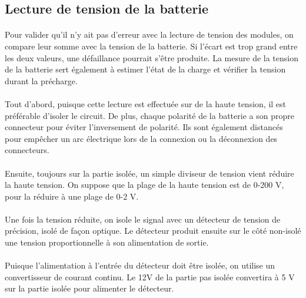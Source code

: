 \subsection{Lecture de tension de la batterie}
	\paragraph*{}
	Pour valider qu'il n'y ait pas d'erreur avec la lecture de tension des modules, on compare leur somme avec la tension de la batterie. Si l'écart est trop grand entre les deux valeurs, une défaillance pourrait s'être produite. La mesure de la tension de la batterie sert également à estimer l'état de la charge et vérifier la tension durant la précharge. 
	
	\paragraph*{}
	Tout d'abord, puisque cette lecture est effectuée sur de la haute tension, il est préférable d'isoler le circuit. De plus, chaque polarité de la batterie a son propre connecteur pour éviter l'inversement de polarité. Ils sont également distancés pour empêcher un arc électrique lors de la connexion ou la déconnexion des connecteurs.
	
	\paragraph*{}
	Ensuite, toujours sur la partie isolée, un simple diviseur de tension vient réduire la haute tension. On suppose que la plage de la haute tension est de 0-200 V, pour la réduire à une plage de 0-2 V.
	
	\paragraph*{}
	Une fois la tension réduite, on isole le signal avec un détecteur de tension de précision, isolé de façon optique. Le détecteur produit ensuite sur le côté non-isolé une tension proportionnelle à son alimentation de sortie.
	
	\paragraph*{}	
	Puisque l'alimentation à l'entrée du détecteur doit être isolée, on utilise un convertisseur de courant continu. Le 12V de la partie pas isolée convertira à 5 V sur la partie isolée pour alimenter le détecteur.
	
